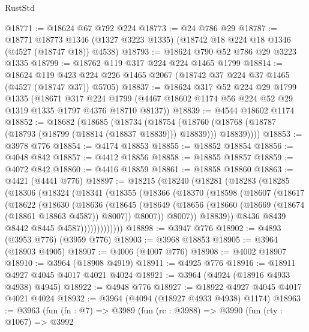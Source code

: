 \begin{lexlean}{RustStd}
\begin{coremodule}
{\begin{coremodule}
{{{{{{{{{{{{{{{{{{{{{{{{{{{{{{{{{{{{{{@18771 := @18624 @67 @792 @224
@18773 := @24 @786 @29
@18787 := @18771
    @18773
    @1346
    (@1327 @3223 @1335)
    (@18742 @18 @224 @18 @1346 (@4527 (@18747 @18)) @4538)
@18793 := @18624 @790 @52 @786 @29 @3223 @1335
@18799 := @18762 @119 @317 @224 @224 @1465 @1799
@18814 := @18624
    @119
    @423
    @224
    @226
    @1465
    @2067
    (@18742 @37 @224 @37 @1465 (@4527 (@18747 @37)) @5705)
@18837 := @18624
    @317
    @52
    @224
    @29
    @1799
    @1335
    (@18671
      @317
      @224
      @1799
      (@4467 @18602 @1174 @56 @224 @52 @29 @1319 @1335 @1797 @4376 @18710 @8137))
@18839 := @4544 @18602 @1174
@18852 := @18682
    (@18685
      (@18734
        (@18754
          (@18760 (@18768 (@18787 (@18793 (@18799 (@18814 (@18837 @18839))) @18839))) @18839))))
@18853 := @3978 @776
@18854 := @4174 @18853
@18855 := @18852 @18854
@18856 := @4048 @842
@18857 := @4412 @18856
@18858 := @18855 @18857
@18859 := @4072 @842
@18860 := @4416 @18859
@18861 := @18858 @18860
@18863 := @4421 (@4441 @776)
@18897 := @18215
    (@18240
      (@18281
        (@18283
          (@18285
            (@18306
              (@18324
                (@18341
                  (@18355
                    (@18366
                      (@18370
                        (@18598
                          (@18607
                            (@18617
                              (@18622
                                (@18630
                                  (@18636
                                    (@18645
                                      (@18649
                                        (@18656
                                          (@18660 (@18669 (@18674 (@18861 @18863 @4587)) @8007))
                                          @8007))
                                      @8007))
                                  @18839))
                              @8436
                              @8439
                              @8442
                              @8445
                              @4587)))))))))))))
@18898 := @3947 @776
@18902 := @4893 (@3953 @776) (@3959 @776)
@18903 := @3968 @18853
@18905 := @3964 (@18903 @4905)
@18907 := @4006 (@4007 @776)
@18908 := @4002 @18907
@18910 := @3964 (@18908 @4919)
@18911 := @4925 @776
@18916 := @18911 @4927 @4045 @4017 @4021 @4024
@18921 := @3964 (@4924 (@18916 @4933 @4938) @4945)
@18922 := @4948 @776
@18927 := @18922 @4927 @4045 @4017 @4021 @4024
@18932 := @3964 (@4094 (@18927 @4933 @4938) @1174)
@18963 := @3963
    (fun (fn : @7) =>
    @3989
      (fun (rc : @3988) =>
      @3990
        (fun (rty : @1067) =>
        @3992
}}}}}}}}}}}}}}}}}}}}}}}}}}}}}}}}}}}}}}
\end{coremodule}}
\end{coremodule}
\end{lexlean}
